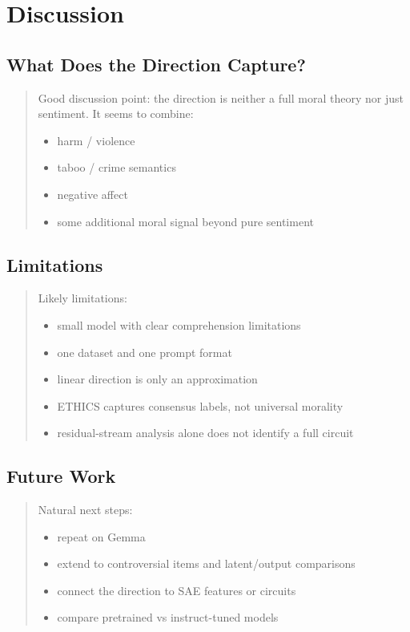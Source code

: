 \documentclass[11pt]{article}
\newcommand{\draftnote}[1]{%
  \begin{quote}\footnotesize\color{gray}#1\end{quote}%
}
\begin{document}
\begin{table}[t]
    \centering
    \small
    \resizebox{0.9\linewidth}{!}{}
    \caption{Held-out AUROC for each MFRC foundation direction evaluated in the same focal best-decoding layers as Table~\ref{tab:mfrc-foundation-angles}. This provides the decoding context for the angular comparisons: some foundations remain strongly decodable even in layers where another foundation is maximal.}
    \label{tab:mfrc-foundation-auroc}
\end{table}

\section{Discussion}
\subsection{What Does the Direction Capture?}
\draftnote{
Good discussion point: the direction is neither a full moral theory nor just sentiment.
It seems to combine:
\begin{itemize}[leftmargin=1.5em]
    \item harm / violence
    \item taboo / crime semantics
    \item negative affect
    \item some additional moral signal beyond pure sentiment
\end{itemize}
}

\subsection{Limitations}
\draftnote{
Likely limitations:
\begin{itemize}[leftmargin=1.5em]
    \item small model with clear comprehension limitations
    \item one dataset and one prompt format
    \item linear direction is only an approximation
    \item ETHICS captures consensus labels, not universal morality
    \item residual-stream analysis alone does not identify a full circuit
\end{itemize}
}

\subsection{Future Work}
\draftnote{
Natural next steps:
\begin{itemize}[leftmargin=1.5em]
    \item repeat on Gemma
    \item extend to controversial items and latent/output comparisons
    \item connect the direction to SAE features or circuits
    \item compare pretrained vs instruct-tuned models
\end{itemize}
}
\end{document}
